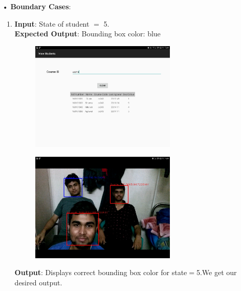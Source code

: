 \documentclass{scrreprt}
\begin{document}
\begin{itemize}
\begin{enumerate}
\newpage
\end{enumerate}
\item[•]\textbf{Boundary Cases}: 
\begin{enumerate}
\item \textbf{Input}: State of student $=$ 5.\\
\textbf{Expected Output}: Bounding box color: blue
\begin{figure}[H]
\centering
\includegraphics[width=0.7\textwidth, keepaspectratio]{camstate.jpg}
\end{figure}
\begin{figure}[H]
\centering
\includegraphics[width=0.7\textwidth, keepaspectratio]{cam3stud.jpg}
\end{figure}
\textbf{Output}: Displays correct bounding box color for state$=$5.We get our desired output.


\end{enumerate}
\end{itemize}
\end{document}
